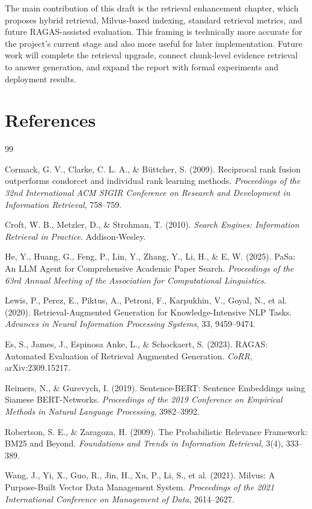\documentclass[11pt,a4paper,oneside]{report}
\begin{document}
The main contribution of this draft is the retrieval enhancement chapter, which
proposes hybrid retrieval, Milvus-based indexing, standard retrieval metrics, and
future RAGAS-assisted evaluation. This framing is technically more accurate for the
project's current stage and also more useful for later implementation. Future work
will complete the retrieval upgrade, connect chunk-level evidence retrieval to answer
generation, and expand the report with formal experiments and deployment results.

\chapter*{References}

\begin{thebibliography}{99}

Cormack, G. V., Clarke, C. L. A., \& B\"uttcher, S. (2009).
Reciprocal rank fusion outperforms condorcet and individual rank learning methods.
\textit{Proceedings of the 32nd International ACM SIGIR Conference on Research and Development in Information Retrieval}, 758--759.

Croft, W. B., Metzler, D., \& Strohman, T. (2010).
\textit{Search Engines: Information Retrieval in Practice}.
Addison-Wesley.

He, Y., Huang, G., Feng, P., Lin, Y., Zhang, Y., Li, H., \& E, W. (2025).
PaSa: An LLM Agent for Comprehensive Academic Paper Search.
\textit{Proceedings of the 63rd Annual Meeting of the Association for Computational Linguistics}.

Lewis, P., Perez, E., Piktus, A., Petroni, F., Karpukhin, V., Goyal, N., et al. (2020).
Retrieval-Augmented Generation for Knowledge-Intensive NLP Tasks.
\textit{Advances in Neural Information Processing Systems}, 33, 9459--9474.

Es, S., James, J., Espinosa Anke, L., \& Schockaert, S. (2023).
RAGAS: Automated Evaluation of Retrieval Augmented Generation.
\textit{CoRR}, arXiv:2309.15217.

Reimers, N., \& Gurevych, I. (2019).
Sentence-BERT: Sentence Embeddings using Siamese BERT-Networks.
\textit{Proceedings of the 2019 Conference on Empirical Methods in Natural Language Processing}, 3982--3992.

Robertson, S. E., \& Zaragoza, H. (2009).
The Probabilistic Relevance Framework: BM25 and Beyond.
\textit{Foundations and Trends in Information Retrieval}, 3(4), 333--389.

Wang, J., Yi, X., Guo, R., Jin, H., Xu, P., Li, S., et al. (2021).
Milvus: A Purpose-Built Vector Data Management System.
\textit{Proceedings of the 2021 International Conference on Management of Data}, 2614--2627.

\end{thebibliography}
\end{document}
